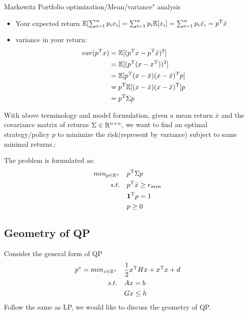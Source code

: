 \begin{example}{Markowitz Portfolio optimization/Mean/variance" analysis}
\begin{itemize}
		\item Your expected return $\mathbb{E}[\sum^n_{i=1}p_ix_i] = \sum^n_{i=1}p_i\mathbb{E}[x_i] = \sum^n_{i=1}p_i\bar{x_i} = p^{{\rm T}}\bar{x}$
		
		\item variance in your return:
		\begin{align*}
		var(p^{{\rm T}}x) &=\mathbb{E}[(p^{{\rm T}}x - p^{{\rm T}}\bar{x})^2]\\
		&= \mathbb{E}[(p^{{\rm T}}(x - x^{{\rm T}}))^2]\\
		&= \mathbb{E}[p^{{\rm T}}(x - \bar{x})(x - \bar{x})^{{\rm T}}p]\\
		&= p^{{\rm T}}\mathbb{E}[(x - \bar{x})(x - \bar{x})^{{\rm T}}]p\\
		&= p^{{\rm T}}\Sigma p
		\end{align*}
	\end{itemize}
	
	
	With above terminology and model formulation, given a mean return $\bar{x}$ and the covariance matrix of returns $\Sigma \in \mathbb{R}^{n\times n}$, we want to find an optimal strategy/policy $p$ to minimize the risk(represent by variance) subject to same minimal returns.: 
	
	The problem is formulated as:
	\begin{align*}
	min_{p\in \mathbb{R}^n}\quad &p^{{\rm T}}\Sigma p\\
	s.t. \quad&p^{{\rm T}}\bar{x}\geq r_{min}\\
	&\textbf{1}^{{\rm T}}p = 1\\
	&p\geq 0
	\end{align*}
\end{example}



\subsection{Geometry of QP}
Consider the general form of QP
\begin{align*}
p^* = min_{x\in \mathbb{R}^n}\quad &\frac{1}{2}x^{{\rm T}}Hx + x^{{\rm T}}x + d\\
s.t.\quad &Ax = b\\
&Gx\leq h
\end{align*}
Follow the same as LP, we would like to discuss the geometry of QP.


